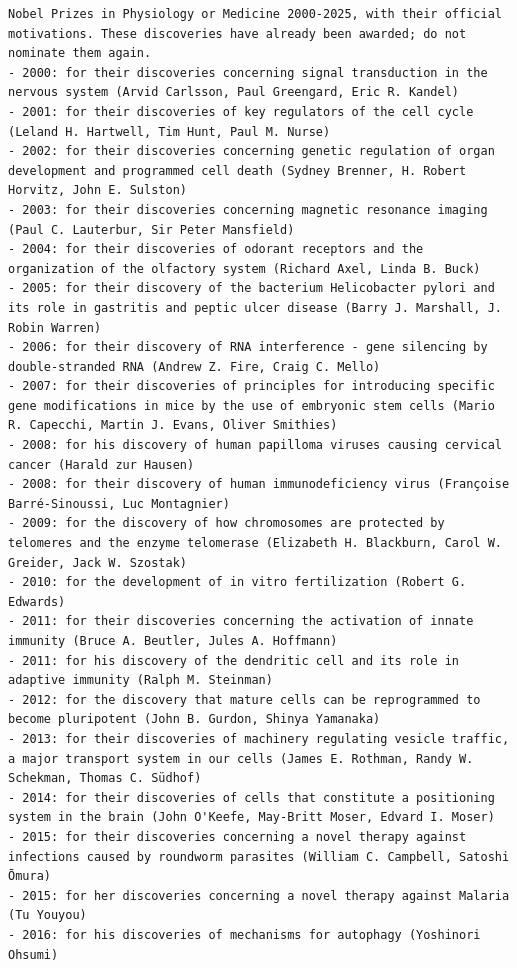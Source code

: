 \documentclass[11pt]{article}
\begin{document}
\begin{Verbatim}
Nobel Prizes in Physiology or Medicine 2000-2025, with their official motivations. These discoveries have already been awarded; do not nominate them again.
- 2000: for their discoveries concerning signal transduction in the nervous system (Arvid Carlsson, Paul Greengard, Eric R. Kandel)
- 2001: for their discoveries of key regulators of the cell cycle (Leland H. Hartwell, Tim Hunt, Paul M. Nurse)
- 2002: for their discoveries concerning genetic regulation of organ development and programmed cell death (Sydney Brenner, H. Robert Horvitz, John E. Sulston)
- 2003: for their discoveries concerning magnetic resonance imaging (Paul C. Lauterbur, Sir Peter Mansfield)
- 2004: for their discoveries of odorant receptors and the organization of the olfactory system (Richard Axel, Linda B. Buck)
- 2005: for their discovery of the bacterium Helicobacter pylori and its role in gastritis and peptic ulcer disease (Barry J. Marshall, J. Robin Warren)
- 2006: for their discovery of RNA interference - gene silencing by double-stranded RNA (Andrew Z. Fire, Craig C. Mello)
- 2007: for their discoveries of principles for introducing specific gene modifications in mice by the use of embryonic stem cells (Mario R. Capecchi, Martin J. Evans, Oliver Smithies)
- 2008: for his discovery of human papilloma viruses causing cervical cancer (Harald zur Hausen)
- 2008: for their discovery of human immunodeficiency virus (Françoise Barré-Sinoussi, Luc Montagnier)
- 2009: for the discovery of how chromosomes are protected by telomeres and the enzyme telomerase (Elizabeth H. Blackburn, Carol W. Greider, Jack W. Szostak)
- 2010: for the development of in vitro fertilization (Robert G. Edwards)
- 2011: for their discoveries concerning the activation of innate immunity (Bruce A. Beutler, Jules A. Hoffmann)
- 2011: for his discovery of the dendritic cell and its role in adaptive immunity (Ralph M. Steinman)
- 2012: for the discovery that mature cells can be reprogrammed to become pluripotent (John B. Gurdon, Shinya Yamanaka)
- 2013: for their discoveries of machinery regulating vesicle traffic, a major transport system in our cells (James E. Rothman, Randy W. Schekman, Thomas C. Südhof)
- 2014: for their discoveries of cells that constitute a positioning system in the brain (John O'Keefe, May-Britt Moser, Edvard I. Moser)
- 2015: for their discoveries concerning a novel therapy against infections caused by roundworm parasites (William C. Campbell, Satoshi Ōmura)
- 2015: for her discoveries concerning a novel therapy against Malaria (Tu Youyou)
- 2016: for his discoveries of mechanisms for autophagy (Yoshinori Ohsumi)

\end{Verbatim}
\end{document}
